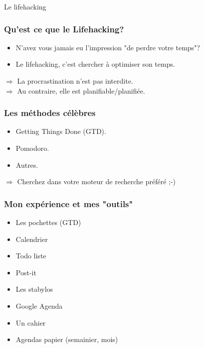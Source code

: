 \documentclass{beamer}
\begin{document}
\begin{frame}
\begin{center}
\Huge{Le lifehacking}
\end{center}
\end{frame}

\begin{frame}
\frametitle{Qu'est ce que le Lifehacking?}
\begin{itemize}
\item N'avez vous jamais eu l'impression "de perdre votre temps"?
\item Le lifehacking, c'est chercher à optimiser son temps.
\end{itemize}
$\Rightarrow$  La procrastination n'est pas interdite. 
\\
$\Rightarrow$  Au contraire, elle est planifiable/planifiée.
\end{frame}

\begin{frame}
\frametitle{Les méthodes célèbres}
\begin{itemize}
\item Getting Things Done (GTD).
\item Pomodoro.
\item Autres.
\end{itemize}
$\Rightarrow$ Cherchez dans votre moteur de recherche préféré ;-)
\end{frame}

\begin{frame}
\frametitle{Mon expérience et mes "outils"}
\begin{itemize}
\item Les pochettes (GTD)
\item Calendrier
\item Todo liste
\item Post-it
\item Les stabylos
\item Google Agenda
\item Un cahier
\item Agendas papier (semainier, mois)
\end{itemize}
\end{frame}
\end{document}
